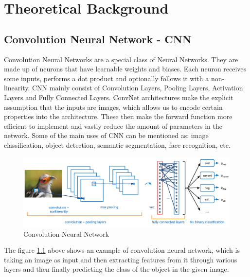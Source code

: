 \chapter{Theoretical Background}

\section{ Convolution Neural Network - CNN }
Convolution Neural Networks are a special class of Neural Networks. They are made up 
of neurons that have learnable weights and biases. Each neuron receives some inputs, 
performs a dot product and optionally follows it with a non-linearity. CNN mainly consist
of Convolution Layers, Pooling Layers, Activation Layers and Fully Connected Layers.
ConvNet architectures make the explicit assumption that the inputs are images, 
which allows us to encode certain properties into the architecture. These then 
make the forward function more efficient to implement and vastly reduce the amount 
of parameters in the network. Some of the main uses of CNN can be mentioned as: image
classification, object detection, semantic segmentation, face recognition, etc.
    
\begin{figure}[H]
	\centering
	\includegraphics[width=\textwidth]{img/Chap3/Cover.png}
	\caption{Convolution Neural Network}
	\label{fig:Chap3-OverviewTheCNN}
\end{figure}
The figure \ref{fig:Chap3-OverviewTheCNN} above shows an example of convolution neural network, which is taking an image 
as input and then extracting features from it through various layers and then finally predicting the
class of the object in the given image.


